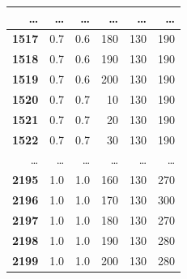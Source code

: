 \documentclass[a4paper,12pt]{article}
\begin{document}
\begin{table} [h!]
\begin{center}
\begin{tabular}{|r|r|r|r|r|r|}
\hline
\ldots & \ldots & \ldots & \ldots & \ldots & \ldots\\
\hline
{\bf 1517} &        0.7 &        0.6 &        180 &        130 &        190 \\
\hline
{\bf 1518} &        0.7 &        0.6 &        190 &        130 &        190 \\
\hline
{\bf 1519} &        0.7 &        0.6 &        200 &        130 &        190 \\
\hline
{\bf 1520} &        0.7 &        0.7 &         10 &        130 &        190 \\
\hline
{\bf 1521} &        0.7 &        0.7 &         20 &        130 &        190 \\
\hline
{\bf 1522} &        0.7 &        0.7 &         30 &        130 &        190 \\
\hline
\ldots & \ldots & \ldots & \ldots & \ldots & \ldots\\
\hline
{\bf 2195} &        1.0 &        1.0 &      160 &        130 &        270 \\
\hline
{\bf 2196} &        1.0 &        1.0 &      170 &        130 &        300 \\
\hline
{\bf 2197} &        1.0 &        1.0 &      180 &        130 &        270 \\
\hline
{\bf 2198} &        1.0 &        1.0 &      190 &        130 &        280 \\
\hline
{\bf 2199} &        1.0 &        1.0 &      200 &        130 &        280 \\
\hline
\end{tabular}  
\label{param1}
\end{center}
\end{table} 
\end{document}

